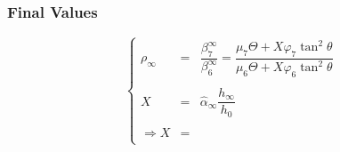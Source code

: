 \documentclass[aps,onecolumn,10pt]{revtex4}
\begin{document}
\subsubsection{Final Values}
\begin{equation}
\left\lbrace
\begin{array}{rcl}
	\rho_\infty & = &  \dfrac{\beta_7^\infty}{\beta_6^\infty} = \dfrac{\mu_7 \Theta + X \varphi_7 \tan^2\theta}{\mu_6 \Theta + X \varphi_6 \tan^2\theta} \\
	\\
	X & = & \hat\alpha_\infty \dfrac{h_\infty}{h_0}\\
	\\
	\Rightarrow	X & = & \\
\end{array}
\right.
\end{equation}
\end{document}
